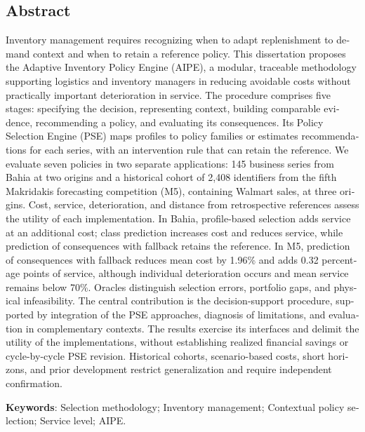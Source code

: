 \begin{otherlanguage}{english}
\chapter*{\centering Abstract}
Inventory management requires recognizing when to adapt replenishment to demand context and when to retain a reference policy. This dissertation proposes the Adaptive Inventory Policy Engine (AIPE), a modular, traceable methodology supporting logistics and inventory managers in reducing avoidable costs without practically important deterioration in service. The procedure comprises five stages: specifying the decision, representing context, building comparable evidence, recommending a policy, and evaluating its consequences. Its Policy Selection Engine (PSE) maps profiles to policy families or estimates recommendations for each series, with an intervention rule that can retain the reference. We evaluate seven policies in two separate applications: 145 business series from Bahia at two origins and a historical cohort of 2,408 identifiers from the fifth Makridakis forecasting competition (M5), containing Walmart sales, at three origins. Cost, service, deterioration, and distance from retrospective references assess the utility of each implementation. In Bahia, profile-based selection adds service at an additional cost; class prediction increases cost and reduces service, while prediction of consequences with fallback retains the reference. In M5, prediction of consequences with fallback reduces mean cost by 1.96\% and adds 0.32 percentage points of service, although individual deterioration occurs and mean service remains below 70\%. Oracles distinguish selection errors, portfolio gaps, and physical infeasibility. The central contribution is the decision-support procedure, supported by integration of the PSE approaches, diagnosis of limitations, and evaluation in complementary contexts. The results exercise its interfaces and delimit the utility of the implementations, without establishing realized financial savings or cycle-by-cycle PSE revision. Historical cohorts, scenario-based costs, short horizons, and prior development restrict generalization and require independent confirmation.

\vspace{2em}
\textbf{Keywords}: Selection methodology; Inventory management; Contextual policy selection; Service level; AIPE.
\end{otherlanguage}
